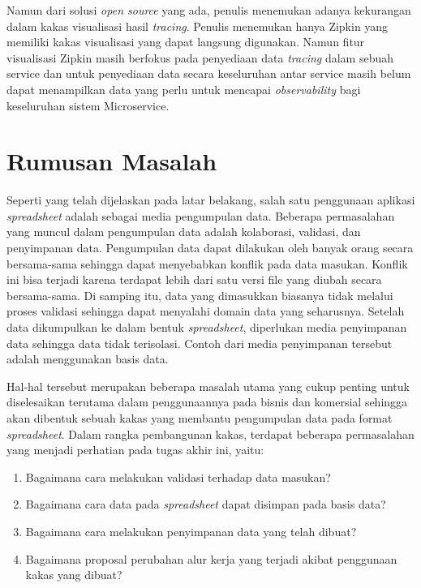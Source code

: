 Namun dari solusi \textit{open source} yang ada, penulis menemukan adanya kekurangan dalam kakas visualisasi hasil \textit{tracing}. Penulis menemukan hanya Zipkin yang memiliki kakas visualisasi yang dapat langsung digunakan. Namun fitur visualisasi Zipkin masih berfokus pada penyediaan data \textit{tracing} dalam sebuah service dan untuk penyediaan data secara keseluruhan antar service masih belum dapat menampilkan data yang perlu untuk mencapai \textit{observability} bagi keseluruhan sistem Microservice. 


\section{Rumusan Masalah}\label{RumusanMasalah}

Seperti yang telah dijelaskan pada latar belakang, salah satu penggunaan aplikasi \textit{spreadsheet} adalah sebagai media pengumpulan data. Beberapa permasalahan yang muncul dalam pengumpulan data adalah kolaborasi, validasi, dan penyimpanan data. Pengumpulan data dapat dilakukan oleh banyak orang secara bersama-sama sehingga dapat menyebabkan konflik pada data masukan. Konflik ini bisa terjadi karena terdapat lebih dari satu versi file yang diubah secara bersama-sama. Di samping itu, data yang dimasukkan biasanya tidak melalui proses validasi sehingga dapat menyalahi domain data yang seharusnya. Setelah data dikumpulkan ke dalam bentuk \textit{spreadsheet}, diperlukan media penyimpanan data sehingga data tidak terisolasi. Contoh dari media penyimpanan tersebut adalah menggunakan basis data.

Hal-hal tersebut merupakan beberapa masalah utama yang cukup penting untuk diselesaikan terutama dalam penggunaannya pada bisnis dan komersial sehingga akan dibentuk sebuah kakas yang membantu pengumpulan data pada format \textit{spreadsheet}. Dalam rangka pembangunan kakas, terdapat beberapa permasalahan yang menjadi perhatian pada tugas akhir ini, yaitu:

\begin{enumerate}
    \item Bagaimana cara melakukan validasi terhadap data masukan?
    \item Bagaimana cara data pada \textit{spreadsheet} dapat disimpan pada basis data?
    \item Bagaimana cara melakukan penyimpanan data yang telah dibuat?
    \item Bagaimana proposal perubahan alur kerja yang terjadi akibat penggunaan kakas yang dibuat?
\end{enumerate}

